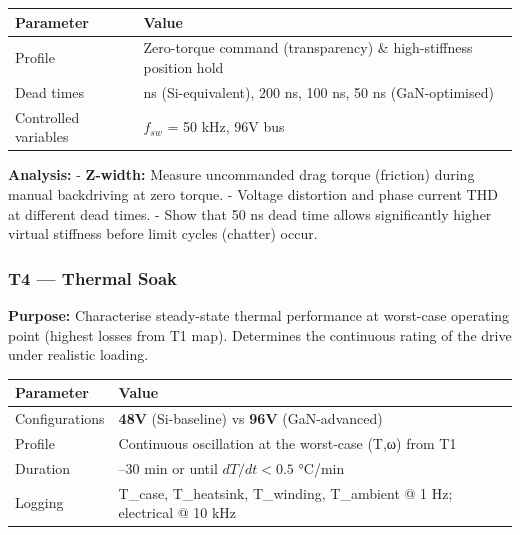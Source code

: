 \documentclass[
]{article}
\newcounter{none} %
\begin{document}
{\def\LTcaptype{none} %
\begin{longtable}[]{@{}
  >{\raggedright\arraybackslash}p{}
  >{\raggedright\arraybackslash}p{}@{}}
\toprule\noalign{}
\begin{minipage}[b]{\linewidth}\raggedright
Parameter
\end{minipage} & \begin{minipage}[b]{\linewidth}\raggedright
Value
\end{minipage} \\
\midrule\noalign{}
\endhead
\bottomrule\noalign{}
\endlastfoot
Profile & Zero-torque command (transparency) \& high-stiffness position
hold \\
Dead times & 500 ns (Si-equivalent), 200 ns, 100 ns, 50 ns
(GaN-optimised) \\
Controlled variables & \(f_{sw}\) = 50 kHz, 96V bus \\
\end{longtable}
}

\textbf{Analysis:} - \textbf{Z-width:} Measure uncommanded drag torque
(friction) during manual backdriving at zero torque. - Voltage
distortion and phase current THD at different dead times. - Show that 50
ns dead time allows significantly higher virtual stiffness before limit
cycles (chatter) occur.

\subsubsection{T4 --- Thermal Soak}\label{t4-thermal-soak}

\textbf{Purpose:} Characterise steady-state thermal performance at
worst-case operating point (highest losses from T1 map). Determines the
continuous rating of the drive under realistic loading.

{\def\LTcaptype{none} %
\begin{longtable}[]{@{}
  >{\raggedright\arraybackslash}p{}
  >{\raggedright\arraybackslash}p{}@{}}
\toprule\noalign{}
\begin{minipage}[b]{\linewidth}\raggedright
Parameter
\end{minipage} & \begin{minipage}[b]{\linewidth}\raggedright
Value
\end{minipage} \\
\midrule\noalign{}
\endhead
\bottomrule\noalign{}
\endlastfoot
Configurations & \textbf{48V} (Si-baseline) vs \textbf{96V}
(GaN-advanced) \\
Profile & Continuous oscillation at the worst-case (T,ω) from T1 \\
Duration & 20--30 min or until \(dT/dt < 0.5\) °C/min \\
Logging & T\_case, T\_heatsink, T\_winding, T\_ambient @ 1 Hz;
electrical @ 10 kHz \\
\end{longtable}
}
\end{document}
